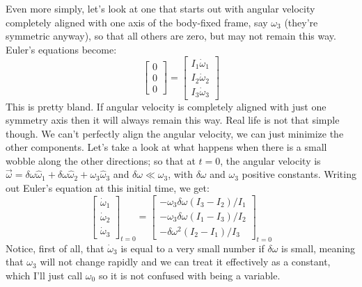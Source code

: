 \documentclass[10pt]{article}
\begin{document}
Even more simply, let's look at one that starts out with angular velocity 
completely aligned with one axis of the body-fixed frame, say $\omega_3$ 
(they're symmetric anyway), so that all others are zero, but may not 
remain this way. Euler's equations become:
\begin{equation*}
    \begin{bmatrix}
        0 \\
        0 \\
        0
    \end{bmatrix}
        =
        \begin{bmatrix}
            I_1\dot{\omega}_1 \\
            I_2\dot{\omega}_2 \\
            I_3\dot{\omega}_3
        \end{bmatrix}
\end{equation*}
This is pretty bland. If angular velocity is completely aligned with 
just one symmetry axis then it will always remain this way. Real life 
is not that simple though. We can't perfectly align the angular velocity, 
we can just minimize the other components. Let's take a look at what 
happens when there is a small wobble along the other directions; so that 
at $t=0$, the angular velocity is
$\vec{\omega} = \delta\omega\hat{\omega}_1 + \delta\omega\hat{\omega}_2 +
 \omega_3\hat{\omega}_3$ and $\delta\omega \ll \omega_3$, with $\delta\omega$ 
and $\omega_3$ positive constants. Writing out Euler's equation at this initial
time, we get:
\begin{equation*}
    \begin{bmatrix}
       \dot{\omega}_1 \\
       \dot{\omega}_2 \\
       \dot{\omega}_3
    \end{bmatrix}_{t=0}
        =
        \begin{bmatrix}
            -\omega_3\delta\omega(I_3 - I_2)/I_1 \\
            -\omega_3\delta\omega(I_1 - I_3)/I_2 \\
            -\delta\omega^2(I_2 - I_1)/I_3
        \end{bmatrix}_{t=0}
\end{equation*}
Notice, first of all, that $\dot{\omega}_3$ is equal to a very small number 
if $\delta\omega$ is small, meaning that $\omega_3$ will not change rapidly and 
we can treat it effectively as a constant, which I'll just call $\omega_0$ so 
it is not confused with being a variable. 
\end{document}
